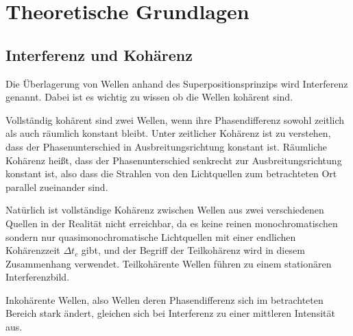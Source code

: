 \section{Theoretische Grundlagen}
    \subsection{Interferenz und Kohärenz}
        Die Überlagerung von Wellen anhand des Superpositionsprinzips wird Interferenz genannt. Dabei ist es wichtig zu wissen ob die Wellen kohärent sind.

        Vollständig kohärent sind zwei Wellen, wenn ihre Phasendifferenz sowohl zeitlich als auch räumlich konstant bleibt.
        Unter zeitlicher Kohärenz ist zu verstehen, dass der Phasenunterschied in Ausbreitungsrichtung konstant ist.
        Räumliche Kohärenz heißt, dass der Phasenunterschied senkrecht zur Ausbreitungsrichtung konstant ist, also dass die Strahlen von den Lichtquellen zum betrachteten Ort parallel zueinander sind.

        Natürlich ist vollständige Kohärenz zwischen Wellen aus zwei verschiedenen Quellen in der Realität nicht erreichbar, da es keine reinen monochromatischen sondern nur quasimonochromatische Lichtquellen mit einer endlichen Kohärenzzeit $\Delta t_c$ gibt, und der Begriff der Teilkohärenz wird in diesem Zusammenhang verwendet.
        Teilkohärente Wellen führen zu einem stationären Interferenzbild.

        Inkohärente Wellen, also Wellen deren Phasendifferenz sich im betrachteten Bereich stark ändert, gleichen sich bei Interferenz zu einer mittleren Intensität aus.

